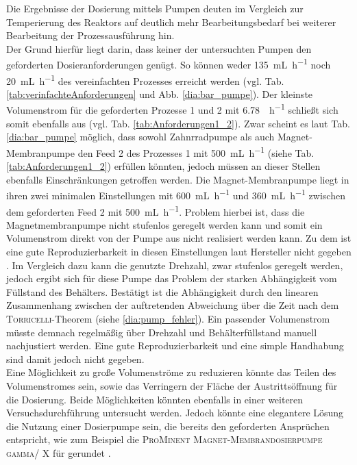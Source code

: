 Die Ergebnisse der Dosierung mittels Pumpen deuten im Vergleich zur Temperierung des Reaktors auf deutlich mehr Bearbeitungsbedarf bei weiterer Bearbeitung der Prozessausführung hin.\\
Der Grund hierfür liegt darin, dass keiner der untersuchten Pumpen den geforderten Dosieranforderungen genügt. So können weder \SI{135}{\milli \liter \per \hour} noch \SI{20}{\milli \liter \per \hour} des vereinfachten Prozesses erreicht werden (vgl. Tab. \ref{tab:verinfachteAnforderungen} und Abb. \ref{dia:bar_pumpe}). Der kleinste Volumenstrom für die geforderten Prozesse 1 und 2 mit \SI{6,78}{\milli \per \hour} schließt sich somit ebenfalls aus (vgl. Tab. \ref{tab:Anforderungen1_2}). Zwar scheint es laut Tab. \ref{dia:bar_pumpe} möglich, dass sowohl Zahnrradpumpe als auch Magnet-Membranpumpe den Feed 2 des Prozesses 1 mit \SI{500}{\milli \liter \per \hour} (siehe Tab. \ref{tab:Anforderungen1_2}) erfüllen könnten, jedoch müssen an dieser Stellen ebenfalls Einschränkungen getroffen werden. Die Magnet-Membranpumpe liegt in ihren zwei minimalen Einstellungen mit \SI{600}{\milli \liter \per \hour} und \SI{360}{\milli \liter \per \hour} zwischen dem geforderten Feed 2 mit \SI{500}{\milli \liter \per \hour}. Problem hierbei ist, dass die Magnetmembranpumpe nicht stufenlos geregelt werden kann und somit ein Volumenstrom direkt von der Pumpe aus nicht realisiert werden kann. Zu dem ist eine gute Reproduzierbarkeit in diesen Einstellungen laut Hersteller nicht gegeben \cite[S. 7]{prominent_beta_anleitung}. Im Vergleich dazu kann die genutzte Drehzahl, zwar stufenlos geregelt werden, jedoch ergibt sich für diese Pumpe das Problem der starken Abhängigkeit vom Füllstand des Behälters. Bestätigt ist die Abhängigkeit durch den linearen Zusammenhang zwischen der auftretenden Abweichung über die Zeit nach dem \textsc{Torricelli}-Theorem (siehe \ref{dia:pump_fehler}). Ein passender Volumenstrom müsste demnach regelmäßig über Drehzahl und Behälterfüllstand manuell nachjustiert werden. Eine gute Reproduzierbarkeit und eine simple Handhabung sind damit jedoch nicht gegeben.\\
Eine Möglichkeit zu große Volumenströme zu reduzieren könnte das Teilen des Volumenstromes sein, sowie das Verringern der Fläche der Austrittsöffnung für die Dosierung. Beide Möglichkeiten könnten ebenfalls in einer weiteren Versuchsdurchführung untersucht werden. Jedoch könnte eine elegantere Lösung die Nutzung einer Dosierpumpe sein, die bereits den geforderten Ansprüchen entspricht, wie zum Beispiel die \textsc{ProMinent Magnet-Membrandosierpumpe gamma/ X} für gerundet  \cite{preis_prominent_gamma_x}.


